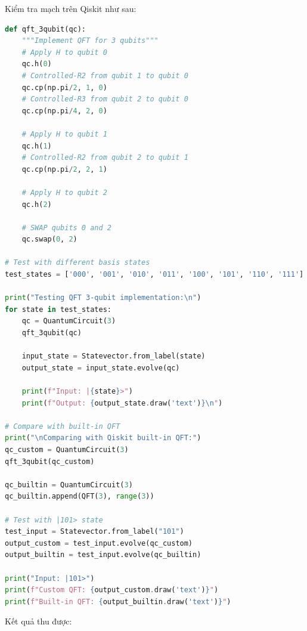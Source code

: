 Kiểm tra mạch trên Qiskit như sau:
\begin{lstlisting}[language=Python]
def qft_3qubit(qc):
    """Implement QFT for 3 qubits"""
    # Apply H to qubit 0
    qc.h(0)
    # Controlled-R2 from qubit 1 to qubit 0
    qc.cp(np.pi/2, 1, 0)
    # Controlled-R3 from qubit 2 to qubit 0
    qc.cp(np.pi/4, 2, 0)
    
    # Apply H to qubit 1
    qc.h(1)
    # Controlled-R2 from qubit 2 to qubit 1
    qc.cp(np.pi/2, 2, 1)
    
    # Apply H to qubit 2
    qc.h(2)
    
    # SWAP qubits 0 and 2
    qc.swap(0, 2)

# Test with different basis states
test_states = ['000', '001', '010', '011', '100', '101', '110', '111']

print("Testing QFT 3-qubit implementation:\n")
for state in test_states:
    qc = QuantumCircuit(3)
    qft_3qubit(qc)
    
    input_state = Statevector.from_label(state)
    output_state = input_state.evolve(qc)
    
    print(f"Input: |{state}>")
    print(f"Output: {output_state.draw('text')}\n")

# Compare with built-in QFT
print("\nComparing with Qiskit built-in QFT:")
qc_custom = QuantumCircuit(3)
qft_3qubit(qc_custom)

qc_builtin = QuantumCircuit(3)
qc_builtin.append(QFT(3), range(3))

# Test with |101> state
test_input = Statevector.from_label("101")
output_custom = test_input.evolve(qc_custom)
output_builtin = test_input.evolve(qc_builtin)

print("Input: |101>")
print(f"Custom QFT: {output_custom.draw('text')}")
print(f"Built-in QFT: {output_builtin.draw('text')}")
\end{lstlisting}

Kết quả thu được:


